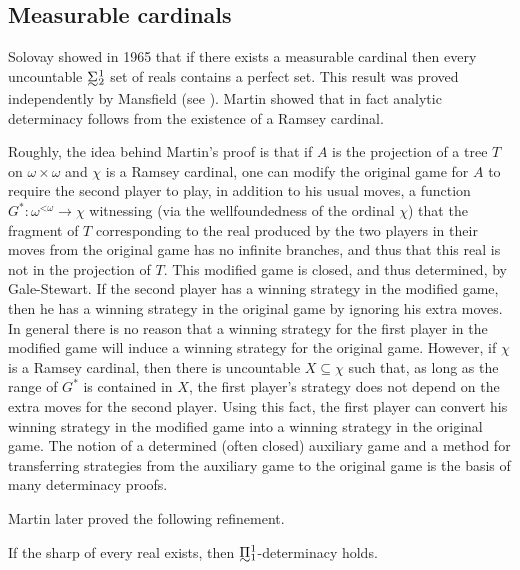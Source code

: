\documentclass{book}%
\def\underTilde#1{{\baselineskip=0pt\vtop{\hbox{$#1$}\hbox{$\sim$}}}{}}
\newcommand{\uTPi}{\underTilde{\Pi}}
\newcommand{\uTSigma}{\underTilde{\Sigma}}
\newcommand{\less}{\mathord{<}}
\begin{document}
\subsection{Measurable cardinals}

Solovay  showed in 1965 that if there exists a measurable
cardinal then every uncountable $\uTSigma^{1}_{2}$ set of reals contains a perfect set. This result was
proved independently by Mansfield (see \cite{Solovay:1969}).
Martin  showed that in fact analytic determinacy
follows from the existence of a Ramsey cardinal.

Roughly, the idea behind Martin's proof is that if $A$ is the
projection of a tree $T$ on $\omega \times \omega$ and $\chi$ is a Ramsey cardinal,
one can modify the original game for $A$
to require the second player to play, in addition to his usual moves, a function $G^{*} \colon \omega^{\less\omega} \to \chi$
witnessing (via the wellfoundedness of the ordinal $\chi$) that the fragment of $T$ corresponding to the real
produced by the two players in their moves from the original game has no infinite branches, and thus that this real is not in the projection of $T$.
This modified game is closed, and thus
determined, by Gale-Stewart. If the second player has a winning
strategy in the modified game, then he has a winning strategy in the
original game by ignoring his extra moves. In general there is no
reason that a winning strategy for the first player in the modified game will
induce a winning strategy for the original game. However, if $\chi$ is a Ramsey cardinal, then there is
uncountable $X \subseteq \chi$ such that, as long as the range of $G^{*}$  is contained in $X$,
the first player's strategy does not depend on the extra moves for the second player.
Using this fact, the first player can convert his winning strategy in the modified game into a winning
strategy in the original game. The notion of a determined (often closed) auxiliary game and
a method for transferring strategies from the auxiliary game to the
original game is the basis of many determinacy proofs.

Martin
later proved the following refinement.
\begin{theorem}\label{pi11det}
If the sharp of every real exists, then $\uTPi^{1}_{1}$-determinacy
holds.
\end{theorem}
\end{document}
